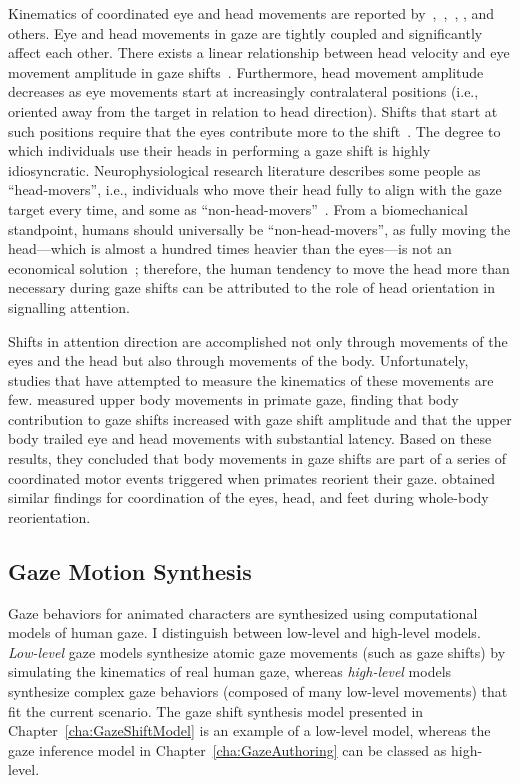 Kinematics of coordinated eye and head movements are reported by~\citet{guitton1987gaze},~\citet{freedman2000coordination},~\citet{barnes1979vor}, \citet{uemura1980eyehead}, and others. Eye and head movements in gaze are tightly coupled and significantly affect each other. There exists a linear relationship between head velocity and eye movement amplitude in gaze shifts~\cite{barnes1979vor,uemura1980eyehead}. Furthermore, head movement amplitude decreases as eye movements start at increasingly contralateral positions (i.e., oriented away from the target in relation to head direction). Shifts that start at such positions require that the eyes contribute more to the shift~\cite{mccluskey2007monkeys}. The degree to which individuals use their heads in performing a gaze shift is highly idiosyncratic. Neurophysiological research literature describes some people as ``head-movers'', i.e., individuals who move their head fully to align with the gaze target every time, and some as ``non-head-movers''~\cite{fuller1992head}. From a biomechanical standpoint, humans should universally be ``non-head-movers'', as fully moving the head---which is almost a hundred times heavier than the eyes---is not an economical solution~\cite{kim2007head}; therefore, the human tendency to move the head more than necessary during gaze shifts can be attributed to the role of head orientation in signalling attention.

Shifts in attention direction are accomplished not only through movements of the eyes and the head but also through movements of the body. Unfortunately, studies that have attempted to measure the kinematics of these movements are few. \citet{mccluskey2007monkeys} measured upper body movements in primate gaze, finding that body contribution to gaze shifts increased with gaze shift amplitude and that the upper body trailed eye and head movements with substantial latency. Based on these results, they concluded that body movements in gaze shifts are part of a series of coordinated motor events triggered when primates reorient their gaze. \citet{hollands2004wholebody} obtained similar findings for coordination of the eyes, head, and feet during whole-body reorientation.

\subsection{Gaze Motion Synthesis}

Gaze behaviors for animated characters are synthesized using computational models of human gaze. I distinguish between low-level and high-level models. \emph{Low-level} gaze models synthesize atomic gaze movements (such as gaze shifts) by simulating the kinematics of real human gaze, whereas \emph{high-level} models synthesize complex gaze behaviors (composed of many low-level movements) that fit the current scenario. The gaze shift synthesis model presented in Chapter~\ref{cha:GazeShiftModel} is an example of a low-level model, whereas the gaze inference model in Chapter~\ref{cha:GazeAuthoring} can be classed as high-level.

